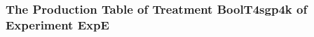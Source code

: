  \begin{frame}
 \fontsize{8pt}{9pt}\selectfont
 \frametitle{ The Production Table of Treatment BoolT4sgp4k of Experiment ExpE }

 \label{ExpEGrammarTable002.tex}  
 \end{frame}

